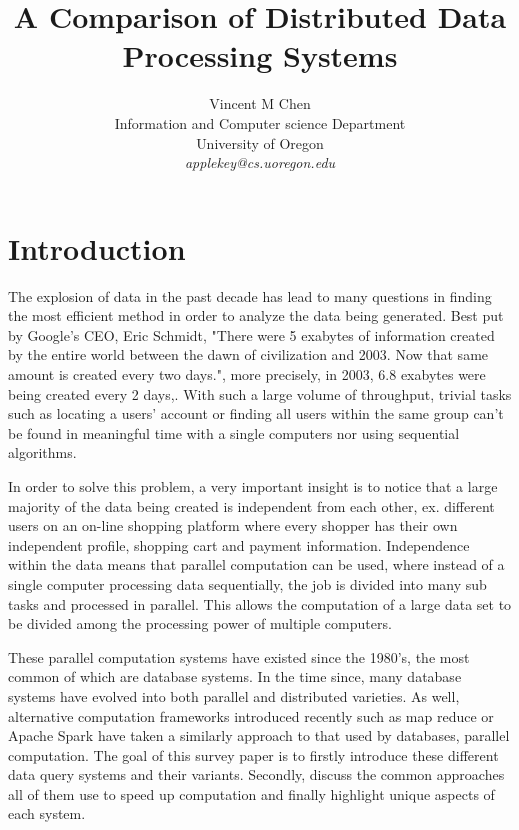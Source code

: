 \documentclass[10pt,twocolumn]{IEEEtran11}
\begin{document}


\title{\Large \bf A Comparison of Distributed Data Processing Systems}
\author{
Vincent M Chen\\
Information and Computer science Department\\
University of Oregon\\
{\em applekey@cs.uoregon.edu}
}
\maketitle

\section{Introduction}
The explosion of data in the past decade has lead to many questions in finding the most efficient method in order to analyze the data being generated. Best put by Google's CEO, Eric Schmidt, "There were 5 exabytes of information created by the entire world between the dawn of civilization and 2003. Now that same amount is created every two days.", more precisely, in 2003, 6.8 exabytes were being created every 2 days,\cite{gantz2010digital}.  With such a large volume of throughput, trivial tasks such as locating a users' account or finding all users within the same group can't be found in meaningful time with a single computers nor using sequential algorithms.
\par
In order to solve this problem, a very important insight is to notice that a large majority of the data being created is independent from each other, ex. different users on an on-line shopping platform where every shopper has their own independent profile, shopping cart and payment information.  Independence within the data means that parallel computation can be used, where instead of a single computer processing data sequentially, the job is divided into many sub tasks and processed in parallel.  This allows the computation of a large data set to be divided among the processing power of multiple computers.
\par
These parallel computation systems have existed since the 1980's, the most common of which are database systems. In the time since, many database systems have evolved into both parallel and distributed varieties.  As well, alternative computation frameworks introduced recently such as map reduce or Apache Spark have taken a  similarly approach to that used by databases, parallel computation.  The goal of this survey paper is to firstly introduce these different data query systems and their variants.  Secondly, discuss the common approaches all of them use to speed up computation and finally highlight unique aspects of each system.
\end{document}
